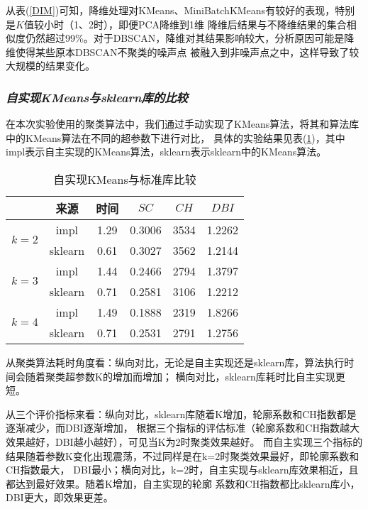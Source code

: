 \documentclass{acm_proc_article-sp}
\begin{document}
从表(\ref{DIM})可知，降维处理对KMeans、MiniBatchKMeans有较好的表现，特别是$K$值较小时（1、2时），即便PCA降维到1维
降维后结果与不降维结果的集合相似度仍然超过99\%。对于DBSCAN，降维对其结果影响较大，分析原因可能是降维使得某些原本DBSCAN不聚类的噪声点
被融入到非噪声点之中，这样导致了较大规模的结果变化。

\subsubsection{\textit{自实现KMeans与sklearn库的比较}}
在本次实验使用的聚类算法中，我们通过手动实现了KMeans算法，将其和算法库中的KMeans算法在不同的超参数下进行对比，
具体的实验结果见表(\ref{IMPL})，其中impl表示自主实现的KMeans算法，sklearn表示sklearn中的KMeans算法。

\begin{table}[!htb]
\small
\centering
\caption{自实现KMeans与标准库比较}
\begin{tabular}{@{}c|c|cccc@{}}
\toprule
                            & 来源        & 时间 & $\mathit{SC}$ & $\mathit{CH}$ & $\mathit{DBI}$ \\ \midrule
\multirow{2}{*}{$k=2$}      & impl        &1.29&0.3006&3534&1.2262\\
                            & sklearn     &0.61&0.3027&3562&1.2144\\ \midrule
\multirow{2}{*}{$k=3$}      & impl        &1.44&0.2466&2794&1.3797\\
                            & sklearn     &0.71&0.2581&3106&1.2212\\ \midrule
\multirow{2}{*}{$k=4$}      & impl        &1.49&0.1888&2319&1.8266\\
                            & sklearn     &0.71&0.2531&2791&1.2756\\ \bottomrule
\end{tabular}
\label{IMPL}
\end{table}
       
从聚类算法耗时角度看：纵向对比，无论是自主实现还是sklearn库，算法执行时间会随着聚类超参数K的增加而增加；
横向对比，sklearn库耗时比自主实现更短。

从三个评价指标来看：纵向对比，sklearn库随着K增加，轮廓系数和CH指数都是逐渐减少，而DBI逐渐增加，
根据三个指标的评估标准（轮廓系数和CH指数越大效果越好，DBI越小越好），可见当K为2时聚类效果越好。
而自主实现三个指标的结果随着参数K变化出现震荡，不过同样是在k=2时聚类效果最好，即轮廓系数和CH指数最大，
DBI最小；横向对比，k=2时，自主实现与sklearn库效果相近，且都达到最好效果。随着K增加，自主实现的轮廓
系数和CH指数都比sklearn库小，DBI更大，即效果更差。
\end{document}
